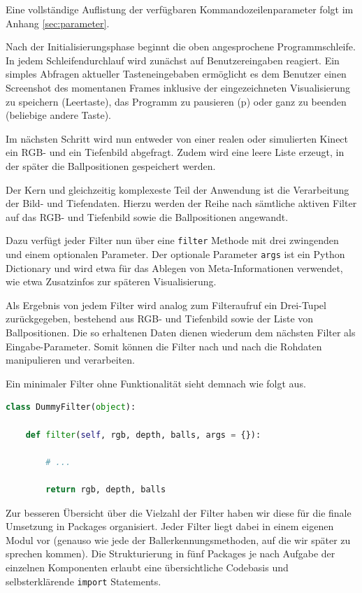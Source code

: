 \documentclass[12pt,a4paper,ngerman]{scrartcl}
\begin{document}
Eine vollständige Auflistung der verfügbaren Kommandozeilenparameter folgt im Anhang \ref{sec:parameter}.

Nach der Initialisierungsphase beginnt die oben angesprochene Programmschleife.
In jedem Schleifendurchlauf wird zunächst auf Benutzereingaben reagiert.
Ein simples Abfragen aktueller Tasteneingebaben ermöglicht es dem Benutzer einen Screenshot des momentanen Frames inklusive der eingezeichneten Visualisierung zu speichern (Leertaste), das Programm zu pausieren (p) oder ganz zu beenden (beliebige andere Taste).

Im nächsten Schritt wird nun entweder von einer realen oder simulierten Kinect ein RGB- und ein Tiefenbild abgefragt. Zudem wird eine leere Liste erzeugt, in der später die Ballpositionen gespeichert werden.

Der Kern und gleichzeitig komplexeste Teil der Anwendung ist die Verarbeitung der Bild- und Tiefendaten.
Hierzu werden der Reihe nach sämtliche aktiven Filter auf das RGB- und Tiefenbild sowie die Ballpositionen angewandt.

Dazu verfügt jeder Filter nun über eine \lstinline{filter} Methode mit drei zwingenden und einem optionalen
Parameter. Der optionale Parameter \lstinline{args} ist ein Python Dictionary und wird etwa für das 
Ablegen von Meta-Informationen verwendet, wie etwa Zusatzinfos zur späteren Visualisierung.

Als Ergebnis von jedem Filter wird analog zum Filteraufruf ein Drei-Tupel zurückgegeben, bestehend aus RGB- und Tiefenbild sowie der Liste von Ballpositionen. Die so erhaltenen Daten dienen wiederum dem nächsten Filter als Eingabe-Parameter. Somit können die Filter nach und nach die Rohdaten manipulieren und verarbeiten.

Ein minimaler Filter ohne Funktionalität sieht demnach wie folgt aus.

\begin{lstlisting}[language=Python,caption={Grundstruktur eines Filters. In diesem Beispiel werden die Eingabedaten unverändert zurückgegeben.}]
class DummyFilter(object):

    def filter(self, rgb, depth, balls, args = {}):

        # ...

        return rgb, depth, balls
\end{lstlisting}

Zur besseren Übersicht über die Vielzahl der Filter haben wir diese für die finale Umsetzung in Packages organisiert. Jeder Filter liegt dabei in einem eigenen Modul vor (genauso wie jede der Ballerkennungsmethoden, auf die wir später zu sprechen kommen). Die Strukturierung in fünf Packages je nach Aufgabe der einzelnen Komponenten erlaubt eine übersichtliche Codebasis und selbsterklärende \lstinline{import} Statements.
\end{document}
